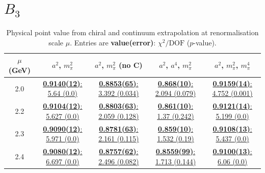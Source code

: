\documentclass[12pt]{extarticle}
\begin{document}
\section{$B_3$}
\begin{table}[h!]
\begin{center}
\begin{tabular}{|c|c|c|c|c|}
\hline
$\mu$ (GeV) & $a^2$, $m_\pi^2$& $a^2$, $m_\pi^2$ (no C)& $a^2$, $a^4$, $m_\pi^2$& $a^2$, $m_\pi^2$, $m_\pi^4$\\
\hline
2.0& \hyperlink{SSmPP/NPR/a2m2_20.pdf.1}{\textbf{0.9140(12)}: 5.64 (0.0)} & \hyperlink{SSmPP/NPR/a2m2noC_20.pdf.1}{\textbf{0.8853(65)}: 3.392 (0.034)} & \hyperlink{SSmPP/NPR/a2a4m2_20.pdf.1}{\textbf{0.868(10)}: 2.094 (0.079)} & \hyperlink{SSmPP/NPR/a2m2m4_20.pdf.1}{\textbf{0.9159(14)}: 4.752 (0.001)}\\
2.2& \hyperlink{SSmPP/NPR/a2m2_22.pdf.1}{\textbf{0.9104(12)}: 5.627 (0.0)} & \hyperlink{SSmPP/NPR/a2m2noC_22.pdf.1}{\textbf{0.8803(63)}: 2.059 (0.128)} & \hyperlink{SSmPP/NPR/a2a4m2_22.pdf.1}{\textbf{0.861(10)}: 1.37 (0.242)} & \hyperlink{SSmPP/NPR/a2m2m4_22.pdf.1}{\textbf{0.9121(14)}: 5.199 (0.0)}\\
2.3& \hyperlink{SSmPP/NPR/a2m2_23.pdf.1}{\textbf{0.9090(12)}: 5.971 (0.0)} & \hyperlink{SSmPP/NPR/a2m2noC_23.pdf.1}{\textbf{0.8781(63)}: 2.161 (0.115)} & \hyperlink{SSmPP/NPR/a2a4m2_23.pdf.1}{\textbf{0.859(10)}: 1.532 (0.19)} & \hyperlink{SSmPP/NPR/a2m2m4_23.pdf.1}{\textbf{0.9108(13)}: 5.437 (0.0)}\\
2.4& \hyperlink{SSmPP/NPR/a2m2_24.pdf.1}{\textbf{0.9080(12)}: 6.697 (0.0)} & \hyperlink{SSmPP/NPR/a2m2noC_24.pdf.1}{\textbf{0.8757(62)}: 2.496 (0.082)} & \hyperlink{SSmPP/NPR/a2a4m2_24.pdf.1}{\textbf{0.8559(99)}: 1.713 (0.144)} & \hyperlink{SSmPP/NPR/a2m2m4_24.pdf.1}{\textbf{0.9100(13)}: 6.06 (0.0)}\\
\hline
\end{tabular}
\caption{Physical point value from chiral and continuum extrapolation at renormalisation scale $\mu$. Entries are \textbf{value(error)}: $\chi^2/\text{DOF}$ ($p$-value).}
\end{center}
\end{table}
\end{document}
